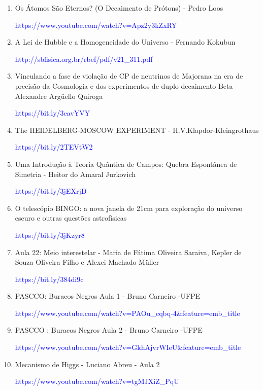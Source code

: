 \documentclass{article}
\begin{document}
\begin{enumerate}
   \item{Os Átomos São Eternos? (O Decaimento de Prótons) - Pedro Loos}
   
   \textcolor{blue}{https://www.youtube.com/watch?v=Apz2y3kZxRY}
   
   \item A Lei de Hubble e a Homogeneidade do Universo - Fernando Kokubun
   
   \textcolor{blue}{http://sbfisica.org.br/rbef/pdf/v21_311.pdf}
   
   \item Vinculando a fase de violação de CP de neutrinos de Majorana na era de precisão da Cosmologia e dos experimentos de duplo decaimento Beta - Alexandre Argüello Quiroga
   
   \textcolor{blue}{https://bit.ly/3eavYVY} 
   
   \item The HEIDELBERG-MOSCOW EXPERIMENT - H.V.Klapdor-Kleingrothaus

   \textcolor{blue}{https://bit.ly/2TEVtW2}
   
   \item Uma Introdução à Teoria Quântica de Campos: Quebra
   Espontânea de Simetria - Heitor do Amaral Jurkovich
  
   \textcolor{blue}{https://bit.ly/3jEXrjD}
   
   \item O telescópio BINGO: a nova janela de 21cm para exploração do universo escuro e outras questões astrofísicas 
   
   \textcolor{blue}{https://bit.ly/3jKzyr8}
   
   \item Aula 22: Meio interestelar - Maria de Fátima Oliveira Saraiva, Kepler de Souza Oliveira Filho e Alexei Machado Müller

    
   
   \textcolor{blue}{https://bit.ly/384di9c}
   
   \item PASCCO: Buracos Negros Aula 1 - Bruno Carneiro -UFPE
   
   \textcolor{blue}{https://www.youtube.com/watch?v=PAOu_cqbq-4&feature=emb_title}
   
   \item PASCCO : Buracos Negros Aula 2 - Bruno Carneiro -UFPE
   
   \textcolor{blue}{https://www.youtube.com/watch?v=GkhAjvrWIeU&feature=emb_title}
   
   \item Mecanismo de Higgs - Luciano Abreu - Aula 2
   
  \textcolor{blue}{https://www.youtube.com/watch?v=tgMJXiZ_PqU}
   
\end{enumerate}
\end{document}
